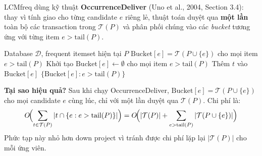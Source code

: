 \documentclass[12pt,a4paper]{article}
\theoremstyle{definition}
\begin{document}
LCMfreq dùng kỹ thuật \textbf{OccurrenceDeliver} (Uno et al., 2004, Section 3.4): thay vì tính giao cho từng candidate $e$ riêng lẻ, thuật toán duyệt qua \textbf{một lần} toàn bộ các transaction trong $\mathcal{T}(P)$ và phân phối chúng vào các \textit{bucket} tương ứng với từng item $e > \mathrm{tail}(P)$.

\begin{algorithm}[H]
\caption{OccurrenceDeliver: Đếm support tất cả candidate cùng lúc (Uno et al., 2004, Section 3.4)}
\label{alg:occdeliver}
\begin{algorithmic}[1]
\Require Database $\mathcal{D}$, frequent itemset hiện tại $P$
\Ensure $\mathrm{Bucket}[e] = \mathcal{T}(P \cup \{e\})$ cho mọi item $e > \mathrm{tail}(P)$
\State Khởi tạo $\mathrm{Bucket}[e] \gets \emptyset$ cho mọi item $e > \mathrm{tail}(P)$
        \State Thêm $t$ vào $\mathrm{Bucket}[e]$
    \EndFor
\EndFor
\State \Return $\{\mathrm{Bucket}[e] : e > \mathrm{tail}(P)\}$
\end{algorithmic}
\end{algorithm}

\textbf{Tại sao hiệu quả?} Sau khi chạy OccurrenceDeliver, $\mathrm{Bucket}[e] = \mathcal{T}(P \cup \{e\})$ cho mọi candidate $e$ cùng lúc, chỉ với một lần duyệt qua $\mathcal{T}(P)$. Chi phí là:
\[
    O\!\Bigl(\sum_{t \in \mathcal{T}(P)} |t \cap \{e : e > \mathrm{tail}(P)\}|\Bigr)
    = O\!\Bigl(|\mathcal{T}(P)| + \sum_{e > \mathrm{tail}(P)} |\mathcal{T}(P \cup \{e\})|\Bigr)
\]
Phức tạp này nhỏ hơn down project vì tránh được chi phí lặp lại $|\mathcal{T}(P)|$ cho mỗi ứng viên.
\end{document}
